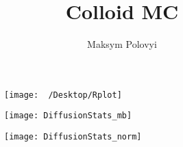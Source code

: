 \documentclass[12pt,a4paper]{article}
\author{Maksym Polovyi}
\title{Colloid MC}
\begin{document}
\begin{figure}[h]
\begin{subfigure}{\textwidth}
	\centering
	\texttt{[image: ~/Desktop/Rplot]}
\end{subfigure}
\begin{subfigure}{\textwidth}
	\centering
	\texttt{[image: DiffusionStats\_mb]}
\end{subfigure}
\begin{subfigure}{\textwidth}
	\centering
	\texttt{[image: DiffusionStats\_norm]}
\end{subfigure}
\end{figure}
\end{document}
